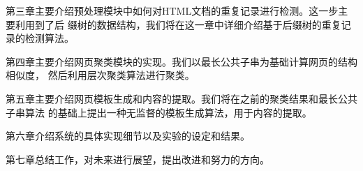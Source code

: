 第三章主要介绍预处理模块中如何对HTML文档的重复记录进行检测。这一步主要利用到了后
缀树的数据结构，我们将在这一章中详细介绍基于后缀树的重复记录的检测算法。

第四章主要介绍网页聚类模块的实现。我们以最长公共子串为基础计算网页的结构相似度，
然后利用层次聚类算法进行聚类。

第五章主要介绍网页模板生成和内容的提取。我们将在之前的聚类结果和最长公共子串算法
的基础上提出一种无监督的模板生成算法，用于内容的提取。

第六章介绍系统的具体实现细节以及实验的设定和结果。

第七章总结工作，对未来进行展望，提出改进和努力的方向。


